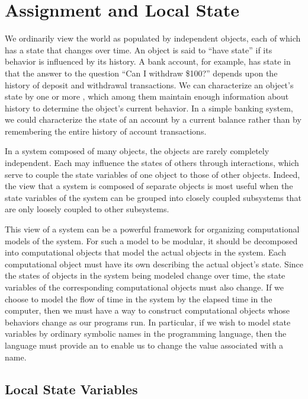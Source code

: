 \section{Assignment and Local State}
\label{Section 3.1}

We ordinarily view the world as populated by independent objects, each of which has a state that changes over time.
An object is said to “have state” if its behavior is influenced by its history.
A bank account, for example, has state in that the answer to the question “Can I withdraw \$100?” depends upon the history of deposit and withdrawal transactions.
We can characterize an object’s state by one or more , which among them maintain enough information about history to determine the object’s current behavior.
In a simple banking system, we could characterize the state of an account by a current balance rather than by remembering the entire history of account transactions.

In a system composed of many objects, the objects are rarely completely independent.
Each may influence the states of others through interactions, which serve to couple the state variables of one object to those of other objects.
Indeed, the view that a system is composed of separate objects is most useful when the state variables of the system can be grouped into closely coupled subsystems that are only loosely coupled to other subsystems.

This view of a system can be a powerful framework for organizing computational models of the system.
For such a model to be modular, it should be decomposed into computational objects that model the actual objects in the system.
Each computational object must have its own  describing the actual object’s state.
Since the states of objects in the system being modeled change over time, the state variables of the corresponding computational objects must also change.
If we choose to model the flow of time in the system by the elapsed time in the computer, then we must have a way to construct computational objects whose behaviors change as our programs run.
In particular, if we wish to model state variables by ordinary symbolic names in the programming language, then the language must provide an  to enable us to change the value associated with a name.



\subsection{Local State Variables}
\label{Section 3.1.1}

